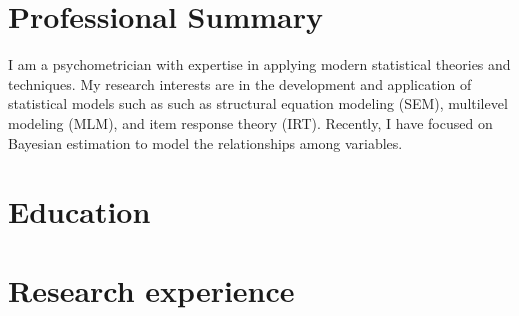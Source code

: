 \documentclass[11pt,a4paper,]{awesome-me}
\begin{document}
\makecvheader






\hypertarget{professional-summary}{%
\section{Professional Summary}\label{professional-summary}}

I am a psychometrician with expertise in applying modern statistical
theories and techniques. My research interests are in the development
and application of statistical models such as such as structural
equation modeling (SEM), multilevel modeling (MLM), and item response
theory (IRT). Recently, I have focused on Bayesian estimation to model
the relationships among variables.

\hypertarget{education}{%
\section{Education}\label{education}}

\begin{cventries}

\end{cventries}

\hypertarget{research-experience}{%
\section{Research experience}\label{research-experience}}
\end{document}
